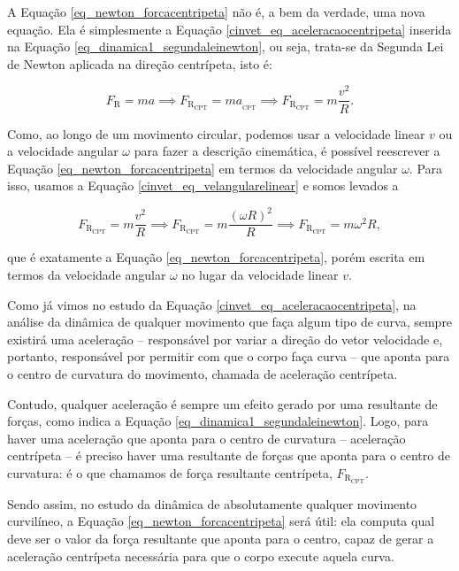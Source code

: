 
A Equação \eqref{eq_newton_forcacentripeta} não é, a bem da verdade, uma nova equação. Ela é simplesmente a Equação \eqref{cinvet_eq_aceleracaocentripeta} inserida na Equação \eqref{eq_dinamica1_segundaleinewton}, ou seja, trata-se da Segunda Lei de Newton aplicada na direção centrípeta, isto é:

$$ F_\text{R}=ma \implies F_{\text{R}_\text{CPT}}=ma_{_\text{CPT}} \implies F_{\text{R}_\text{CPT}}=m \dfrac{v^2}{R}. $$

Como, ao longo de um movimento circular, podemos usar a velocidade linear $v$ ou a velocidade angular $\omega$ para fazer a descrição cinemática, é possível reescrever a Equação \eqref{eq_newton_forcacentripeta} em termos da velocidade angular $\omega.$ Para isso, usamos a Equação \eqref{cinvet_eq_velangularelinear} e somos levados a

$$ F_{\text{R}_\text{CPT}}=m \dfrac{v^2}{R} \implies F_{\text{R}_\text{CPT}}=m \dfrac{(\omega R)^2}{R} \implies \boxed{F_{\text{R}_\text{CPT}}=m \omega^2R,}$$

\noindent que é exatamente a Equação \eqref{eq_newton_forcacentripeta}, porém escrita em termos da velocidade angular $\omega$ no lugar da velocidade linear $v$.



Como já vimos no estudo da Equação \eqref{cinvet_eq_aceleracaocentripeta}, na análise da dinâmica de qualquer movimento que faça algum tipo de curva, sempre existirá uma aceleração -- responsável por variar a direção do vetor velocidade e, portanto, responsável por permitir com que o corpo faça curva -- que aponta para o centro de curvatura do movimento, chamada de aceleração centrípeta. 

Contudo, qualquer aceleração é sempre um efeito gerado por uma resultante de forças, como indica a Equação \eqref{eq_dinamica1_segundaleinewton}. Logo, para haver uma aceleração que aponta para o centro de curvatura -- aceleração centrípeta -- é preciso haver uma resultante de forças que aponta para o centro de curvatura: é o que chamamos de força resultante centrípeta, $F_{\text{R}_\text{CPT}}$. 

Sendo assim, no estudo da dinâmica de absolutamente qualquer movimento curvilíneo, a Equação \eqref{eq_newton_forcacentripeta} será útil: ela computa qual deve ser o valor da força resultante que aponta para o centro, capaz de gerar a aceleração centrípeta necessária para que o corpo execute aquela curva.

